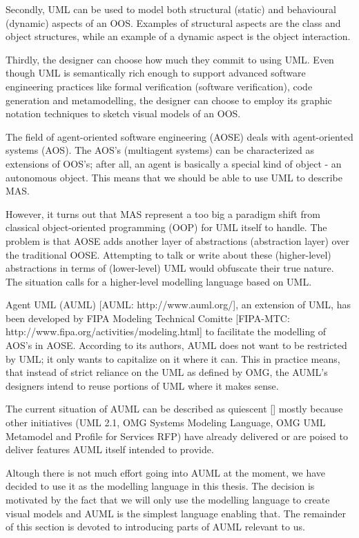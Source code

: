Secondly, UML can be used to model both structural (static) and behavioural (dynamic) aspects of an OOS.
Examples of structural aspects are the class and object structures, while an example of a dynamic aspect is the object interaction.

Thirdly, the designer can choose how much they commit to using UML.
Even though UML is semantically rich enough to support advanced software engineering practices like formal verification (software verification), code generation and metamodelling, the designer can choose to employ its graphic notation techniques to sketch visual models of an OOS.


The field of agent-oriented software engineering (AOSE) deals with agent-oriented systems (AOS).
The AOS's (multiagent systems) can be characterized as extensions of OOS's; after all, an agent is basically a special kind of object - an autonomous object.
This means that we should be able to use UML to describe MAS.

However, it turns out that MAS represent a too big a paradigm shift from classical object-oriented programming (OOP) for UML itself to handle.
The problem is that AOSE adds another layer of abstractions (abstraction layer) over the traditional OOSE.
Attempting to talk or write about these (higher-level) abstractions in terms of (lower-level) UML would obfuscate their true nature.
The situation calls for a higher-level modelling language based on UML.

Agent UML (AUML) [AUML: http://www.auml.org/], an extension of UML, has been developed by FIPA Modeling Technical Comitte [FIPA-MTC: http://www.fipa.org/activities/modeling.html] to facilitate the modelling of AOS's in AOSE.
According to its authors, AUML does not want to be restricted by UML; it only wants to capitalize on it where it can.
This in practice means, that instead of strict reliance on the UML as defined by OMG, the AUML's designers intend to reuse portions of UML where it makes sense.

The current situation of AUML can be described as quiescent [] mostly because other initiatives (UML 2.1, OMG Systems Modeling Language,  OMG UML Metamodel and Profile for Services RFP) have already delivered or are poised to deliver features AUML itself intended to provide.

Altough there is not much effort going into AUML at the moment, we have decided to use it as the modelling language in this thesis.
The decision is motivated by the fact that we will only use the modelling language to create visual models and AUML is the simplest language enabling that.
The remainder of this section is devoted to introducing parts of AUML relevant to us.







